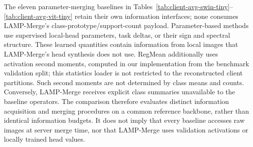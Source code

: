 \documentclass[journal,twoside,web]{ieeecolor}
\begin{document}
The eleven parameter-merging baselines in Tables~\ref{tab:client-avg-swin-tiny}--\ref{tab:client-avg-vit-tiny} retain their own information interfaces; none consumes LAMP-Merge's class-prototype/support-count payload. Parameter-based methods use supervised local-head parameters, task deltas, or their sign and spectral structure. These learned quantities contain information from local images that LAMP-Merge's head synthesis does not use. RegMean additionally uses activation second moments, computed in our implementation from the benchmark validation split; this statistics loader is not restricted to the reconstructed client partitions. Such second moments are not determined by class means and counts. Conversely, LAMP-Merge receives explicit class summaries unavailable to the baseline operators. The comparison therefore evaluates distinct information acquisition and merging procedures on a common reference backbone, rather than identical information budgets. It does not imply that every baseline accesses raw images at server merge time, nor that LAMP-Merge uses validation activations or locally trained head values.
\end{document}
